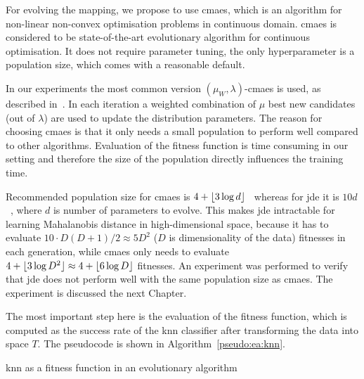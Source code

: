 \documentclass[12pt,a4paper]{report}
\begin{document}
For evolving the mapping, we propose to use \ac{cmaes}, which is an algorithm for non-linear non-convex optimisation problems in continuous domain. \ac{cmaes} is considered to be state-of-the-art evolutionary algorithm for continuous optimisation. It does not require parameter tuning, the only hyperparameter is a population size, which comes with a reasonable default.

In our experiments the most common version $(\mu_W, \lambda)$-\ac{cmaes} is used, as described in~\citep{hansen2001completely}. In each iteration a weighted combination of $\mu$ best new candidates (out of $\lambda$) are used to update the distribution parameters. The reason for choosing \ac{cmaes} is that it only needs a small population to perform well compared to other algorithms. Evaluation of the fitness function is time consuming in our setting and therefore the size of the population directly influences the training time.

Recommended population size for \ac{cmaes} is $4+\lfloor3\log{d}\rfloor$~\citep{hansen2006cma} whereas for \ac{jde} it is $10d$~\citep{brest2006self}, where $d$ is number of parameters to evolve. This makes \ac{jde} intractable for learning Mahalanobis distance in high-dimensional space, because it has to evaluate $10\cdot D(D+1)/2 \approx 5D^2$ ($D$ is dimensionality of the data) fitnesses in each generation, while \ac{cmaes} only needs to evaluate $4+\lfloor3\log{D^2}\rfloor \approx 4+\lfloor6\log{D}\rfloor$ fitnesses. An experiment was performed to verify that \ac{jde} does not perform well with the same population size as \ac{cmaes}. The experiment is discussed the next Chapter.

The most important step here is the evaluation of the fitness function, which is computed as the success rate of the \ac{knn} classifier after transforming the data into space $T$. The pseudocode is shown in Algorithm~\ref{pseudo:ea:knn}.

\begin{algorithm}[t]
\caption{\ac{knn} as a fitness function in an evolutionary algorithm} \label{pseudo:ea:knn}
\DontPrintSemicolon
\LinesNumbered
{}
\end{algorithm}
\end{document}

